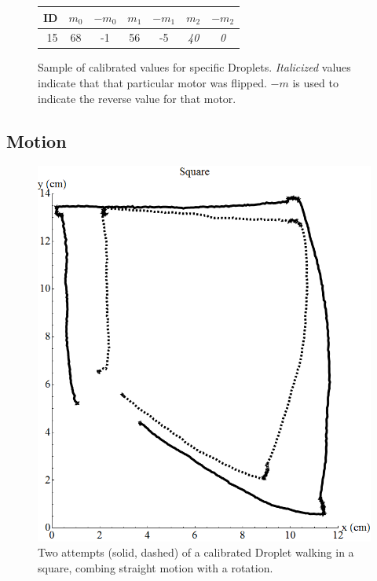 \documentclass[letterpaper, 10pt, conference]{ieeeconf}
\begin{document}
\begin{figure}[!htb]
\centering
\begin{tabular}{r|c|c|c|c|c|c}
 ID & $m_0$ & $-m_0$ & $m_1$ & $-m_1$ & $m_2$ & $-m_2$ \\
\hline
15 & 68 & -1 & 56 & -5 & \emph{40} & \emph{0}\\ 
\end{tabular}
\caption{Sample of calibrated values for specific Droplets. \emph{Italicized} values indicate that that particular motor was flipped. $-m$ is used to indicate the reverse value for that motor.}
\label{dropletValueTable}
\end{figure}


\subsection{Motion}


\begin{figure}[!htb]
\centering
\includegraphics[width=\linewidth]{Images/dropletWalksSquare}
\caption{Two attempts (solid, dashed) of a calibrated Droplet walking in a square, combing straight motion with a rotation.}
\label{fig:someting}
\end{figure}
\end{document}
